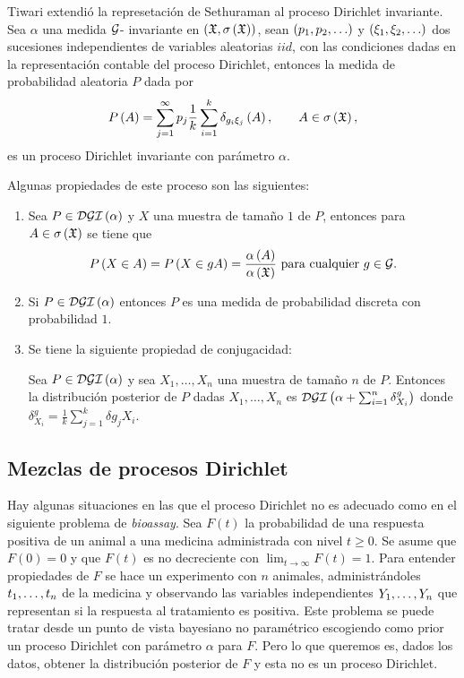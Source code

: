 Tiwari extendió la represetación de Sethuraman al proceso Dirichlet invariante. Sea $\alpha$ una medida $\mathcal{G}$-%
invariante en $\left( \mathfrak{X}, \sigma\left( \mathfrak{X} \right) \right)$, sean $\left( p_{1}, p_{2},\ldots \right)$ y $\left( \xi_{1}, \xi_{2}, \ldots \right)$ dos %
sucesiones independientes de variables aleatorias $iid$, con las condiciones dadas en la representación %
contable del proceso Dirichlet, entonces la medida de probabilidad aleatoria $P$ dada por
\[
P\left( A \right) = \sum_{j = 1}^{\infty} p_{j} \frac{1}{k} \sum_{i = 1}^{k} \delta_{g_{i} \xi_{j}}\left( A \right), \qquad
            A \in \sigma\left( \mathfrak{X} \right),
\]
es un proceso Dirichlet invariante con parámetro $\alpha$.

Algunas propiedades de este proceso son las siguientes:

\begin{enumerate}
    \item Sea $P \in \mathcal{DGI}\left( \alpha \right)$ y $X$ una muestra de tamaño $1$ de $P$, entonces para $A \in \sigma\Pp{%
    \X}$ se tiene que \[
    P\left( X \in A \right) = P\left( X \in gA \right) = \frac{\alpha\left( A \right)}{\alpha\left( \mathfrak{X} \right)} \text{ para cualquier } g \in \mathcal{G}.
    \]
    \item Si $P \in \mathcal{DGI}\left( \alpha \right)$ entonces $P$ es una medida de probabilidad discreta con probabilidad $1$.
    \item Se tiene la siguiente propiedad de conjugacidad: \begin{teor}[Dalal]
    Sea $P \in \mathcal{DGI}\left( \alpha \right)$ y sea $X_{1}, \ldots, X_{n}$ una muestra de tamaño $n$ de $P$. Entonces la %
    distribución posterior de $P$ dadas $X_{1}, \ldots, X_{n}$ es $\DGI\Pp{\alpha + \sum_{i = 1}^{n} \delta^{%
    g}_{X_{i}}}$ donde $\delta_{X_{i}}^{g} = \frac{1}{k} \sum_{j = 1}^{k} \delta{g_{j} X_{i}}$.
    \end{teor}
\end{enumerate}


\subsection{Mezclas de procesos Dirichlet}

Hay algunas situaciones en las que el proceso Dirichlet no es adecuado como en el siguiente problema de \textit{%
bioassay}. Sea $F(t)$ la probabilidad de una respuesta positiva de un animal a una medicina administrada con %
nivel $t \geq 0$. Se asume que $F(0) = 0$ y que $F(t)$ es no decreciente con $\lim_{t \to \infty} F(t) = 1$. Para %
entender propiedades de $F$ se hace un experimento con $n$ animales, administrándoles $t_{1}, \ldots, t_{n}$ de la medicina %
y observando las variables independientes $Y_{1}, \ldots, Y_{n}$ que representan si la respuesta al tratamiento es positiva. %
Este problema se puede tratar desde un punto de vista bayesiano no paramétrico escogiendo como prior un proceso %
Dirichlet con parámetro $\alpha$ para $F$. Pero lo que queremos es, dados los datos, obtener la distribución posterior %
de $F$ y esta no es un proceso Dirichlet.

